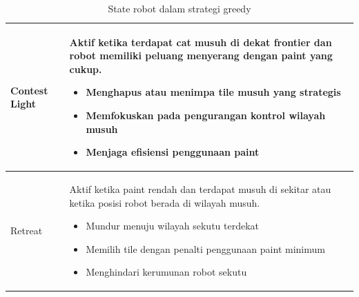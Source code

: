 \documentclass{article}
\begin{document}
\begin{table}[H]
\begin{tabular}{|p{3cm}|p{11cm}|}
Contest Light &
Aktif ketika terdapat cat musuh di dekat frontier dan robot memiliki peluang menyerang dengan paint yang cukup.
\begin{itemize}[leftmargin=*, nosep]
\item Menghapus atau menimpa tile musuh yang strategis
\item Memfokuskan pada pengurangan kontrol wilayah musuh
\item Menjaga efisiensi penggunaan paint
\end{itemize}
\\
\hline

Retreat &
Aktif ketika paint rendah dan terdapat musuh di sekitar atau ketika posisi robot berada di wilayah musuh.
\begin{itemize}[leftmargin=*, nosep]
\item Mundur menuju wilayah sekutu terdekat
\item Memilih tile dengan penalti penggunaan paint minimum
\item Menghindari kerumunan robot sekutu
\end{itemize}
\\
\hline

\end{tabular}
\caption{State robot dalam strategi greedy}
\end{table}
\end{document}
